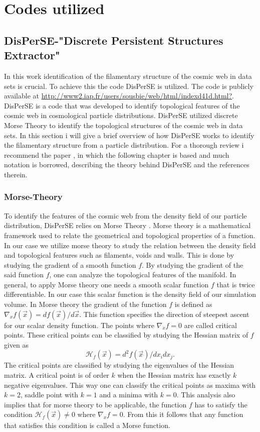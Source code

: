 \chapter{Codes utilized}
\section{DisPerSE-"Discrete Persistent Structures Extractor"}
In this work identification of the filamentary structure of the cosmic web in
data sets is crucial. To achieve this the code
DisPerSE\cite{2011MNRAS.414..350S}\cite{2011MNRAS.414..384S} is utilized. The
code is publicly available at \url{http://www2.iap.fr/users/sousbie/web/html/indexd41d.html?}.
DisPerSE is a code that was developed to identify topological features of the
cosmic web in cosmological particle distributions. DisPerSE utilized discrete
Morse Theory to identify the topological structures of the cosmic web in data
sets. In this section i will give a brief overview of how DisPerSE works to
identify the filamentary structure from a particle distribution. For a thorough
review i recommend the paper \cite{2011MNRAS.414..350S}, in which the following
chapter is based and much notation is borrowed, describing the theory behind DisPerSE and the
references therein.
\subsection{Morse-Theory}
To identify the features of the cosmic web from the density field of our
particle distribution, DisPerSE relies on Morse Theory \cite{Morse}. Morse
theory is a mathematical framework used to relate the geometrical and
topological properties of a function. In our case we utilize morse theory to
study the relation between the density field and topological features such as
filaments, voids and walls.
This is done by studying the gradient of a smooth function $f$. By studying the
gradient of the said function $f$, one can analyze the topological features of
the manifold. In general, to apply Morse theory one needs a smooth scalar function $f$
that is twice differentiable. In our case this scalar function is the density
field of our simulation volume. In Morse theory the gradient of the function $f$
is defined as $\nabla_xf(\vec{x})=df(\vec{x})/d\vec{x}$. This function
specifies the direction of steepest ascent for our scalar density function. The
points where $\nabla_xf=0$ are called critical points. These critical
points can be classified by studying the Hessian matrix of $f$ given as
\begin{equation}
    \mathcal{H}_f(\vec{x})=d^2f(\vec{x})/dx_idx_j.
\end{equation}
The critical points are classified by studying the eigenvalues of the Hessian
matrix. A critical point is of order $k$ when the Hessian matrix has exactly $k$
negative eigenvalues. This way one can classify the critical points as maxima
with $k=2$, saddle point with $k=1$ and a minima with $k=0$. This analysis also
implies that for morse theory to be applicable, the function $f$ has to satisfy
the condition $\mathcal{H}_f(\vec{x})\neq 0$ where $\nabla_xf=0$. From this it
follows that any function that satisfies this condition is called a Morse
function.\\
 
